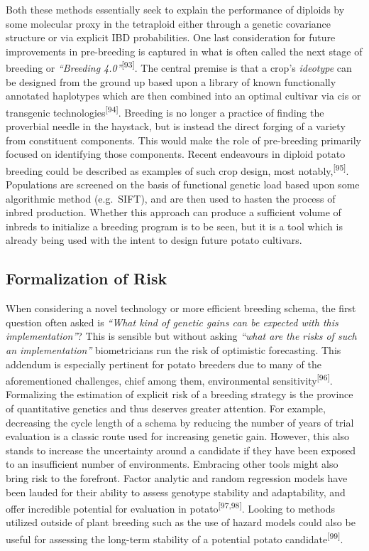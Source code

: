 Both these methods essentially seek to explain the performance of
diploids by some molecular proxy in the tetraploid either through a
genetic covariance structure or via explicit IBD probabilities. One last
consideration for future improvements in pre-breeding is captured in
what is often called the next stage of breeding or \emph{``Breeding
4.0''}\textsuperscript{{[}93{]}}. The central premise is that a crop's
\emph{ideotype} can be designed from the ground up based upon a library
of known functionally annotated haplotypes which are then combined into
an optimal cultivar via cis or transgenic
technologies\textsuperscript{{[}94{]}}. Breeding is no longer a practice
of finding the proverbial needle in the haystack, but is instead the
direct forging of a variety from constituent components. This would make
the role of pre-breeding primarily focused on identifying those
components. Recent endeavours in diploid potato breeding could be
described as examples of such crop design, most
notably,\textsuperscript{{[}95{]}}. Populations are screened on the
basis of functional genetic load based upon some algorithmic method
(e.g.~SIFT), and are then used to hasten the process of inbred
production. Whether this approach can produce a sufficient volume of
inbreds to initialize a breeding program is to be seen, but it is a tool
which is already being used with the intent to design future potato
cultivars.

\subsection{Formalization of Risk}\label{formalization-of-risk}

When considering a novel technology or more efficient breeding
schema, the first question often asked is \emph{``What kind of genetic gains
can be expected with this implementation''}? This is sensible but without asking \emph{``what are the risks of such an
implementation''} biometricians run the risk of optimistic
forecasting. This addendum is especially pertinent for potato breeders
due to many of the aforementioned challenges, chief among them,
environmental sensitivity\textsuperscript{{[}96{]}}. Formalizing the
estimation of explicit risk of a breeding strategy is the province of
quantitative genetics and thus deserves greater attention. For example,
decreasing the cycle length of a schema by reducing the number of years
of trial evaluation is a classic route used for increasing genetic gain.
However, this also stands to increase the uncertainty around a candidate
if they have been exposed to an insufficient number of environments.
Embracing other tools might also bring risk to the forefront. Factor
analytic and random regression models have been lauded for their ability
to assess genotype stability and adaptability, and offer incredible
potential for evaluation in potato\textsuperscript{{[}97,98{]}}. Looking
to methods utilized outside of plant breeding such as the use of hazard
models could also be useful for assessing the long-term stability of a
potential potato candidate\textsuperscript{{[}99{]}}.

